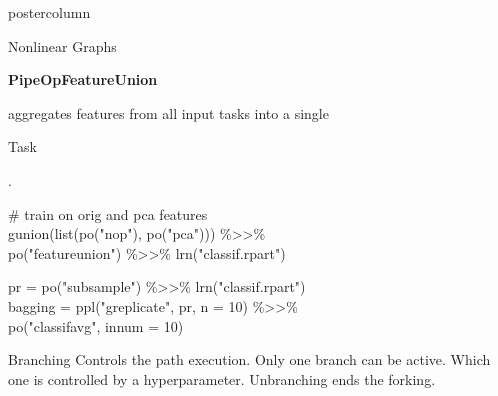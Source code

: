 \documentclass{beamer}
\newcommand{\codeinline}[1]{\begin{codeboxinline}#1\end{codeboxinline}}
\begin{document}
\begin{frame}[fragile]{}
\begin{columns}
\begin{column}{.245\textwidth}
\begin{beamercolorbox}[center]{postercolumn}
\begin{minipage}{.98\textwidth}
{\begin{myblock}{Nonlinear Graphs}
\begin{center}
              \end{center}
              \codeinline{\textbf{PipeOpFeatureUnion}} aggregates features from all input tasks into a single \codeinline{Task}.
              \\
              \begin{codeboxexample}
                {\footnotesize
                \# train on orig and pca features\\
                gunion(list(po("nop"), po("pca"))) \%>{}>\%\\
                \hspace*{1ex} po("featureunion") \%>{}>\% lrn("classif.rpart")}
              \end{codeboxexample}
              \begin{codeboxexample}
                {\footnotesize
                pr = po("subsample") \%>{}>\% lrn("classif.rpart")\\
                bagging = ppl("greplicate", pr, n = 10) \%>{}>\%\\
                \hspace*{1ex} po("classifavg", innum = 10)}
              \end{codeboxexample}
            \end{myblock}
            \vspace{-1.0em}
            \begin{myblock}{Branching}
              Controls the path execution.
              Only one branch can be active.
              Which one is controlled by a hyperparameter.
              Unbranching ends the forking.
              \\
              \begin{codeboxexample}[- Preprocessing]

\end{codeboxexample}
\end{myblock}}
\end{minipage}
\end{beamercolorbox}
\end{column}
\end{columns}
\end{frame}
\end{document}
